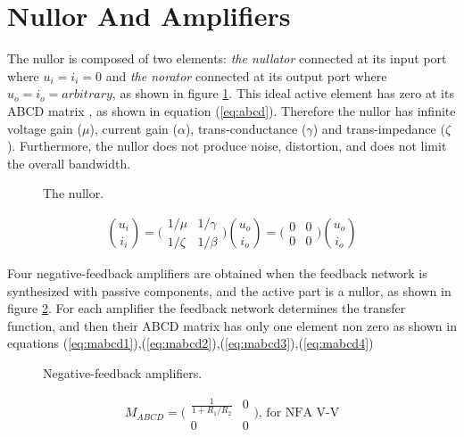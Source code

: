 \documentclass[letterpaper]{ecctd01}
\begin{document}
\section{Nullor And Amplifiers}

The nullor is composed of two elements: {\it the nullator} connected at its input port where $u_i=i_i=0$ and {\it the norator} connected at its output port where $u_o=i_o=arbitrary$, as shown in figure \ref{figure1}. This ideal active element has zero at its ABCD matrix \cite{carlin,moschytz}, as shown in equation (\ref{eq:abcd}). Therefore the nullor has infinite voltage gain ($\mu$), current gain ($\alpha$), trans-conductance ($\gamma$) and trans-impedance ($\zeta$). Furthermore, the nullor does not produce noise, distortion, and does not limit the overall bandwidth.

\begin{figure}[hbtp]
\centerline{
\epsfxsize=50mm
}
\caption{The nullor.}
\label{figure1}
\end{figure} 

\begin{equation}\label{eq:abcd}
\binom{u_i}{i_i}=\bigg(
\begin{array}{cc}
{1/{\mu}}&{1/{\gamma}}\\
{1/{\zeta}}&{1/{\beta}}
\end{array}\bigg)
\binom{u_o}{i_o}=
\bigg(\begin{array}{cc}
0&0\\
0&0
\end{array}\bigg)\binom{u_o}{i_o}
\end{equation}

Four negative-feedback amplifiers are obtained when the feedback network is synthesized with passive components, and the active part is a nullor, as shown in figure \ref{figure2}. For each amplifier the feedback network determines the transfer function, and then their ABCD matrix has only one element non zero as shown in equations (\ref{eq:mabcd1}),(\ref{eq:mabcd2}),(\ref{eq:mabcd3}),(\ref{eq:mabcd4})

\begin{figure}[hbtp]
\centerline{
\epsfxsize=70mm
}
\caption{Negative-feedback amplifiers.}
\label{figure2}
\end{figure} 

\begin{equation}\label{eq:mabcd1}
M_{ABCD}=\bigg(\begin{array}{cc}
\frac{1}{1+R_1/R_2}&0\\
0&0
\end{array}\bigg){\text{, for NFA V-V}}
\end{equation}
\end{document}
